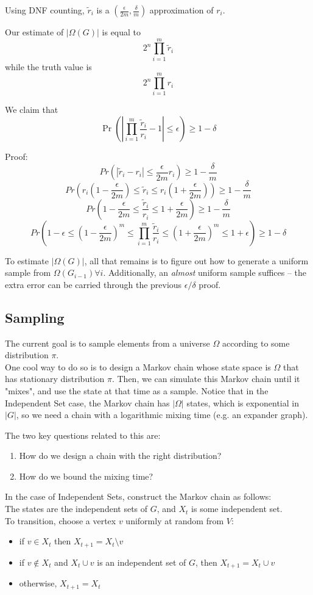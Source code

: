 Using DNF counting, $\tilde r_i$ is a $(\frac{\epsilon}{2m}, \frac{\delta}{m})$ approximation of $r_i$.

Our estimate of $|\Omega(G)|$ is equal to
\[ 2^n \prod_{i=1}^m \tilde r_i \]
while the truth value is
\[ 2^n \prod_{i=1}^m r_i \]

We claim that
\[ \Pr\left(|\prod_{i=1}^m \frac{\tilde r_i}{r_i} - 1| \leq \epsilon\right) \geq 1 - \delta \]

Proof:
\[Pr\left( |\tilde r_i - r_i | \leq \frac{\epsilon}{2m}r_i\right) \geq 1 - \frac{\delta}{m}\]
\[Pr\left( r_i(1-\frac{\epsilon}{2m}) \leq \tilde r_i \leq r_i(1+\frac{\epsilon}{2m})\right) \geq 1 - \frac{\delta}{m} \]
\[Pr\left(1 - \frac{\epsilon}{2m} \leq \frac{\tilde r_i}{r_i} \leq 1 + \frac{\epsilon}{2m}\right) \geq 1 - \frac{\delta}{m} \]
\[Pr\left(1 - \epsilon \leq (1 - \frac{\epsilon}{2m})^m \leq \prod_{i=1}^m \frac{\tilde r_i}{r_i} \leq (1 + \frac{\epsilon}{2m})^m \leq 1 + \epsilon\right) \geq 1 - \delta \]

To estimate $|\Omega(G)|$, all that remains is to figure out how to generate a uniform sample from $\Omega(G_{i-1}) \forall i$.
Additionally, an \emph{almost} uniform sample suffices -- the extra error can be carried through the previous $\epsilon/\delta$ proof.

\subsection{Sampling}
The current goal is to sample elements from a universe $\Omega$ according to some distribution $\pi$. \\
  One cool way to do so is to design a Markov chain whose state space is $\Omega$ that has stationary distribution $\pi$. Then, we can simulate this Markov chain until it "mixes", and use the state at that time as a sample. Notice that in the Independent Set case, the Markov chain has $|\Omega|$ states, which is exponential in $|G|$, so we need a chain with a logarithmic mixing time (e.g. an expander graph).

The two key questions related to this are:
\begin{enumerate}
\item How do we design a chain with the right distribution?
\item How do we bound the mixing time?
\end{enumerate}

In the case of Independent Sets, construct the Markov chain as follows:\\
  The states are the independent sets of $G$, and $X_t$ is some independent set.\\
  To transition, choose a vertex $v$ uniformly at random from $V$:
\begin{itemize}
\item if $v \in X_t$ then $X_{t+1} = X_t \setminus v$
\item if $v \notin X_t$ and $X_t \cup v$ is an independent set of $G$, then $X_{t+1} = X_t \cup v$
\item otherwise, $X_{t+1} = X_t$
\end{itemize}


